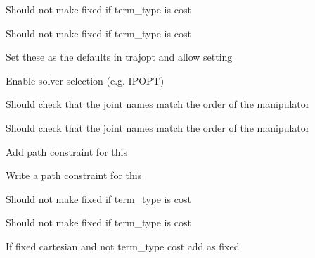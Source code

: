 \begin{DoxyRefList}
\label{todo__todo000057}%
%
Should not make fixed if term\+\_\+type is cost 

\label{todo__todo000056}%
%
Should not make fixed if term\+\_\+type is cost  
\item[Member \mbox{\hyperlink{classtesseract__planning_1_1TrajOptIfoptMotionPlanner_a8571318009fac584c15542ee8b2e4f04}{tesseract\+\_\+planning\+::Traj\+Opt\+Ifopt\+Motion\+Planner\+::solve}} (const \mbox{\hyperlink{structtesseract__planning_1_1PlannerRequest}{Planner\+Request}} \&request) const override]\label{todo__todo000054}%
%
Set these as the defaults in trajopt and allow setting 

\label{todo__todo000053}%
%
Enable solver selection (e.\+g. IPOPT)  
\item[Member \mbox{\hyperlink{classtesseract__planning_1_1TrajOptLegacyMotionPlanner_adf685d33d5b7db44a5c741b7e1443e86}{tesseract\+\_\+planning\+::Traj\+Opt\+Legacy\+Motion\+Planner\+::create\+Problem}} (const \mbox{\hyperlink{structtesseract__planning_1_1PlannerRequest}{Planner\+Request}} \&request) const]\label{todo__todo000043}%
%
Should check that the joint names match the order of the manipulator 

\label{todo__todo000042}%
%
Should check that the joint names match the order of the manipulator 

\label{todo__todo000041}%
%
Add path constraint for this 

\label{todo__todo000040}%
%
Write a path constraint for this  
\item[Member \mbox{\hyperlink{classtesseract__planning_1_1TrajOptMotionPlanner_a6f42bc4743b8be6fd310b7e75282796d}{tesseract\+\_\+planning\+::Traj\+Opt\+Motion\+Planner\+::create\+Problem}} (const \mbox{\hyperlink{structtesseract__planning_1_1PlannerRequest}{Planner\+Request}} \&request) const]\label{todo__todo000046}%
%
Should not make fixed if term\+\_\+type is cost 

\label{todo__todo000045}%
%
Should not make fixed if term\+\_\+type is cost 

\label{todo__todo000044}%
%
If fixed cartesian and not term\+\_\+type cost add as fixed 
\end{DoxyRefList}